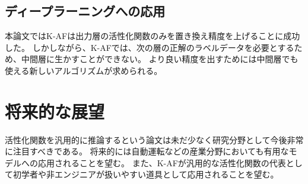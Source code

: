 \subsection{ディープラーニングへの応用}
本論文ではK-AFは出力層の活性化関数のみを置き換え精度を上げることに成功した。
しかしながら、K-AFでは、次の層の正解のラベルデータを必要とするため、中間層に生かすことができない。
より良い精度を出すためには中間層でも使える新しいアルゴリズムが求められる。



\section{将来的な展望}

活性化関数を汎用的に推論するという論文は未だ少なく研究分野として今後非常に注目すべきである。 
将来的には自動運転などの産業分野においても有用なモデルへの応用されることを望む。
また、K-AFが汎用的な活性化関数の代表として初学者や非エンジニアが扱いやすい道具として応用されることを望む。


